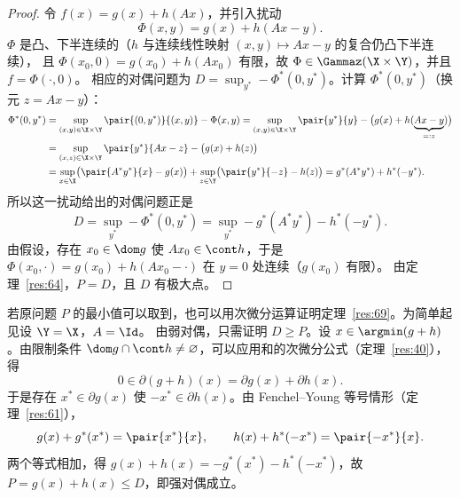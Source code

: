\begin{proof}
令 $f(x)=g(x)+h(Ax)$，并引入扰动
\[
  \Phi(x,y)=g(x)+h(Ax-y).
\]
$\Phi$ 是凸、下半连续的（$h$ 与连续线性映射 $(x,y)\mapsto Ax-y$ 的复合仍凸下半连续），
且 $\Phi(x_0,0)=g(x_0)+h(Ax_0)$ 有限，故 $\Phi\in\Gammaz(\X\times\Y)$，并且 $f=\Phi(\cdot,0)$。
相应的对偶问题为 $D=\sup_{y^*}-\Phi^*(0,y^*)$。计算 $\Phi^*(0,y^*)$（换元 $z=Ax-y$）：
\[
  \begin{aligned}
  \Phi^*(0,y^*)&=\sup_{(x,y)\in\X\times\Y}\pair{(0,y^*)}{(x,y)}-\Phi(x,y)
  =\sup_{(x,y)\in\X\times\Y}\pair{y^*}{y}-\bigl(g(x)+h(\underbrace{Ax-y}_{=:z})\bigr)\\
  &=\sup_{(x,z)\in\X\times\Y}\pair{y^*}{Ax-z}-\bigl(g(x)+h(z)\bigr)\\
  &=\sup_{x\in\X}\bigl(\pair{A^*y^*}{x}-g(x)\bigr)+\sup_{z\in\Y}\bigl(\pair{y^*}{-z}-h(z)\bigr)
  =g^*(A^*y^*)+h^*(-y^*).
  \end{aligned}
\]
所以这一扰动给出的对偶问题正是
\[
  D=\sup_{y^*}-\Phi^*(0,y^*)=\sup_{y^*}-g^*(A^*y^*)-h^*(-y^*).
\]
由假设，存在 $x_0\in\dom g$ 使 $Ax_0\in\cont h$，于是 $\Phi(x_0,\cdot)=g(x_0)+h(Ax_0-\cdot)$ 在 $y=0$ 处连续（$g(x_0)$ 有限）。
由定理~\ref{res:64}，$P=D$，且 $D$ 有极大点。
\end{proof}

\begin{remark}[用次微分运算证明]
\label{rem:23}
若原问题 $P$ 的最小值可以取到，也可以用次微分运算证明定理~\ref{res:69}。为简单起见设 $\Y=\X$，$A=\Id$。
由弱对偶，只需证明 $D\geqslant P$。设 $x\in\argmin(g+h)$。由限制条件 $\dom g\cap\cont h\neq\varnothing$，可以应用和的次微分公式（定理~\ref{res:40}），得
\[
  0\in\partial(g+h)(x)=\partial g(x)+\partial h(x).
\]
于是存在 $x^*\in\partial g(x)$ 使 $-x^*\in\partial h(x)$。由 Fenchel--Young 等号情形（定理~\ref{res:61}），
\[
  g(x)+g^*(x^*)=\pair{x^*}{x},\qquad h(x)+h^*(-x^*)=\pair{-x^*}{x}.
\]
两个等式相加，得 $g(x)+h(x)=-g^*(x^*)-h^*(-x^*)$，故 $P=g(x)+h(x)\leqslant D$，即强对偶成立。
\end{remark}

